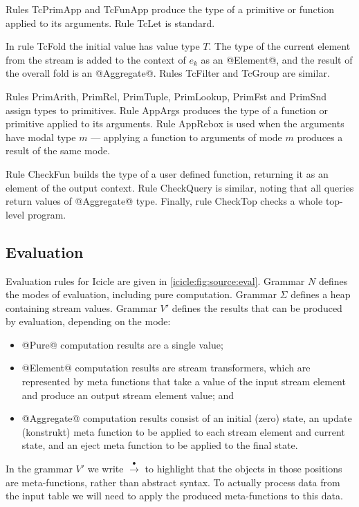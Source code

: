 Rules TcPrimApp and TcFunApp produce the type of a primitive or function applied to its arguments. Rule TcLet is standard.

In rule TcFold the initial value has value type $T$. The type of the current element from the stream is added to the context of $e_k$ as an @Element@, and the result of the overall fold is an @Aggregate@. Rules TcFilter and TcGroup are similar.

Rules PrimArith, PrimRel, PrimTuple, PrimLookup, PrimFst and \mbox{PrimSnd} assign types to primitives.
Rule AppArgs produces the type of a function or primitive applied to its arguments.
Rule AppRebox is used when the arguments have modal type $m$ --- applying a function to arguments of mode $m$ produces a result of the same mode.

Rule CheckFun builds the type of a user defined function, returning it as an element of the output context. Rule CheckQuery is similar, noting that all queries return values of @Aggregate@ type. Finally, rule CheckTop checks a whole top-level program.


\subsection{Evaluation}


Evaluation rules for Icicle are given in \cref{icicle:fig:source:eval}.
Grammar $N$ defines the modes of evaluation, including pure computation.
Grammar $\Sigma$ defines a heap containing stream values.
Grammar $V'$ defines the results that can be produced by evaluation, depending on the mode:
\begin{itemize}
\item
@Pure@ computation results are a single value;
\item
@Element@ computation results are stream transformers, which are represented by meta functions that take a value of the input stream element and produce an output stream element value; and
\item
@Aggregate@ computation results consist of an initial (zero) state, an update (konstrukt) meta function to be applied to each stream element and current state, and an eject meta function to be applied to the final state.
\end{itemize}

In the grammar $V'$ we write $\stackrel{\bullet}{\to}$ to highlight that the objects in those positions are meta-functions, rather than abstract syntax. To actually process data from the input table we will need to apply the produced meta-functions to this data.

